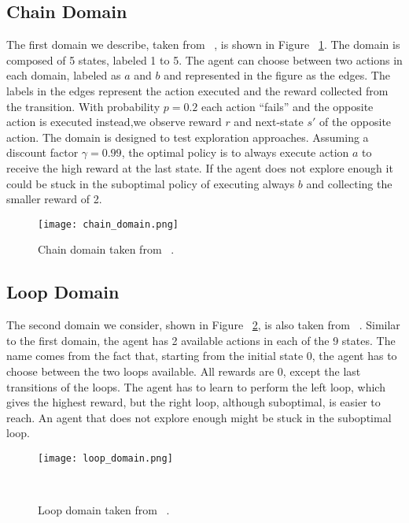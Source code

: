 \subsection{Chain Domain}
The first domain we describe, taken from ~\cite{Dearden98bayesianq-learning}, is shown in Figure ~\ref{fig:chain_domain}. The domain is composed of 5 states, labeled 1 to 5. The agent can choose between two actions in each domain, labeled as $a$ and $b$ and represented in the figure as the edges. The labels in the edges represent the action executed and the reward collected from the transition. With probability $p=0.2$ each action ``fails'' and the opposite action is executed instead,\ie we observe reward $r$ and next-state $s'$ of the opposite action. The domain is designed to test exploration approaches. Assuming a discount factor $\gamma=0.99$, the optimal policy is to always execute action $a$ to receive the high reward at the last state. If the agent does not explore enough it could be stuck in the suboptimal policy of executing always $b$ and collecting the smaller reward of 2.
\begin{figure}
 \texttt{[image: chain\_domain.png]}
 \caption{Chain domain taken from ~\cite{Dearden98bayesianq-learning}.}
 \label{fig:chain_domain}
\end{figure}
\subsection{Loop Domain}
The second domain we consider, shown in Figure ~\ref{fig:loop_domain}, is also taken from ~\cite{Dearden98bayesianq-learning}. Similar to the first domain, the agent has 2 available actions in each of the 9 states. The name comes from the fact that, starting from the initial state 0, the agent has to choose between the two loops available. All rewards are 0, except the last transitions of the loops. The agent has to learn to perform the left loop, which gives the highest reward, but the right loop, although suboptimal, is easier to reach. An agent that does not explore enough might be stuck in the suboptimal loop.
\begin{figure}
 \texttt{[image: loop\_domain.png]}
 \caption{Loop domain taken from ~\cite{Dearden98bayesianq-learning}.} ~
 \label{fig:loop_domain}
\end{figure}
